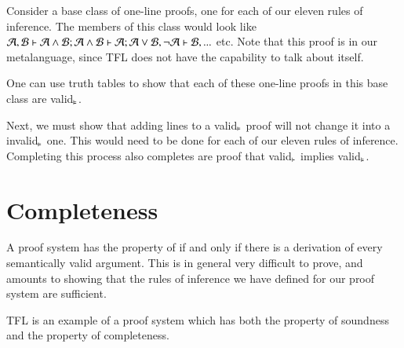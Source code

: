 Consider a base class of one-line proofs, one for each of our eleven rules of inference. The members of this class would look like $\mathcal{A},\mathcal{B}\vdash\mathcal{A}\wedge\mathcal{B}; \mathcal{A}\wedge\mathcal{B}\vdash\mathcal{A};\mathcal{A}\vee\mathcal{B},\neg\mathcal{A}\vdash\mathcal{B},...$ etc. Note that this proof is in our metalanguage, since TFL does not have the capability to talk about itself. 

One can use truth tables to show that each of these one-line proofs in this base class are valid$_{\vDash}$.

Next, we must show that adding lines to a valid$_{\vDash}$ proof will not change it into a invalid$_{\vDash}$ one. This would need to be done for each of our eleven rules of inference. Completing this process also completes are proof that valid$_{\vdash}$ implies valid$_{\vDash}$. 


\section{ Completeness}

\begin{definition}
    A proof system has the property of  if and only if there is a derivation of every semantically valid argument. This is in general very difficult to prove, and amounts to showing that the rules of inference we have defined for our proof system are sufficient.
\end{definition}

\begin{remark}
    TFL is an example of a proof system which has both the property of soundness and the property of completeness.
\end{remark}


